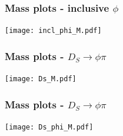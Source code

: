 \documentclass{beamer}
\begin{document}
\LogoOff
\begin{frame}
\frametitle{Mass plots - inclusive $\phi$}
\begin{center}
\texttt{[image: incl\_phi\_M.pdf]}
\end{center}

\end{frame}
\LogoOn

\LogoOff
\begin{frame}
\frametitle{Mass plots - $D_S\rightarrow \phi\pi$}
\begin{center}
\texttt{[image: Ds\_M.pdf]}
\end{center}
\end{frame}
\LogoOn

\LogoOff
\begin{frame}
\frametitle{Mass plots - $D_S\rightarrow \phi\pi$}
\begin{center}
\texttt{[image: Ds\_phi\_M.pdf]}
\end{center}

\end{frame}
\LogoOn
\end{document}
